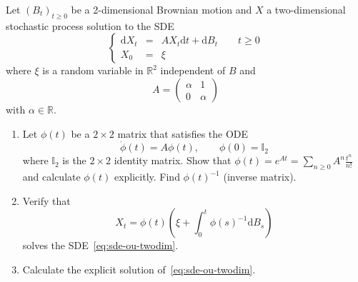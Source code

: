 \documentclass{article}
\newcommand{\mathd}{\mathrm{d}}
\newenvironment{enumeratealpha}{\begin{enumerate}[a{\textup{)}}] }{\end{enumerate}}
{\theorembodyfont{\rmfamily\small}\newtheorem{exercise}{Exercise}}
\begin{document}
\begin{exercise}
  [Pts 3+2+2] Let $(B_t)_{t \geqslant 0}$ be a 2-dimensional Brownian motion
  and $X$ a two-dimensional stochastic process solution to the SDE
  \begin{equation}
    \left\{\begin{array}{lll}
      \mathd X_t & = & A X_t \mathd t + \mathd B_t \qquad t \geqslant 0\\
      X_0 & = & \xi
    \end{array}\right. \label{eq:sde-ou-twodim}
  \end{equation}
  where $\xi$ is a random variable in $\mathbb{R}^2$ independent of $B$ and
  \[ A = \left(\begin{array}{cc}
       \alpha & 1\\
       0 & \alpha
     \end{array}\right) \]
  with $\alpha \in \mathbb{R}$.
  \begin{enumeratealpha}
    \item Let $\phi (t)$ be a $2 \times 2$ matrix that satisfies the ODE
    \[ \dot{\phi} (t) = A \phi (t), \qquad \phi (0) =\mathbb{I}_2 \]
    where $\mathbb{I}_2$ is the $2 \times 2$ identity matrix. Show that $\phi
    (t) = e^{A t} = \sum_{n \geqslant 0} A^n \frac{t^n}{n!}$ and calculate
    $\phi (t)$ explicitly. Find $\phi (t)^{- 1}$ (inverse matrix).
    
    \item Verify that
    \[ X_t = \phi (t) \left( \xi + \int_0^t \phi (s)^{- 1} \mathd B_s \right)
    \]
    solves the SDE~{\eqref{eq:sde-ou-twodim}}.
    
    \item Calculate the explicit solution of~{\eqref{eq:sde-ou-twodim}}.
  \end{enumeratealpha}
\end{exercise}

\

\hrulefill

\
\end{document}
